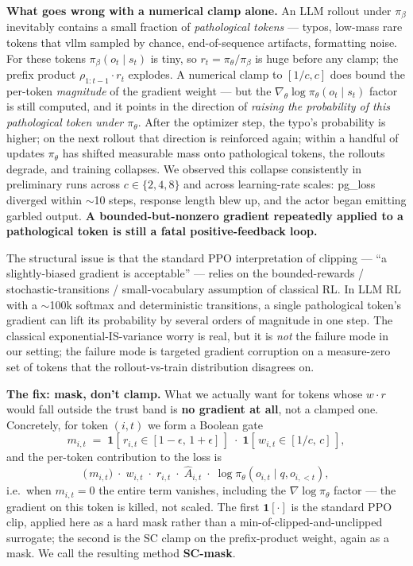 \documentclass[11pt,a4paper]{article}
\theoremstyle{remark}
\begin{document}
\textbf{What goes wrong with a numerical clamp alone.} An LLM rollout under $\pi_\beta$ inevitably contains a small fraction of \emph{pathological tokens} --- typos, low-mass rare tokens that vllm sampled by chance, end-of-sequence artifacts, formatting noise. For these tokens $\pi_\beta(o_t\mid s_t)$ is tiny, so $r_t=\pi_\theta/\pi_\beta$ is huge before any clamp; the prefix product $\rho_{1:t-1}\!\cdot\!r_t$ explodes. A numerical clamp to $[1/c,c]$ does bound the per-token \emph{magnitude} of the gradient weight --- but the $\nabla_\theta\log\pi_\theta(o_t\mid s_t)$ factor is still computed, and it points in the direction of \emph{raising the probability of this pathological token under $\pi_\theta$}. After the optimizer step, the typo's probability is higher; on the next rollout that direction is reinforced again; within a handful of updates $\pi_\theta$ has shifted measurable mass onto pathological tokens, the rollouts degrade, and training collapses. We observed this collapse consistently in preliminary runs across $c\in\{2,4,8\}$ and across learning-rate scales: pg\_loss diverged within $\sim$10 steps, response length blew up, and the actor began emitting garbled output. \textbf{A bounded-but-nonzero gradient repeatedly applied to a pathological token is still a fatal positive-feedback loop.}

The structural issue is that the standard PPO interpretation of clipping --- ``a slightly-biased gradient is acceptable'' --- relies on the bounded-rewards / stochastic-transitions / small-vocabulary assumption of classical RL. In LLM RL with a $\sim$100k softmax and deterministic transitions, a single pathological token's gradient can lift its probability by several orders of magnitude in one step. The classical exponential-IS-variance worry is real, but it is \emph{not} the failure mode in our setting; the failure mode is targeted gradient corruption on a measure-zero set of tokens that the rollout-vs-train distribution disagrees on.

\textbf{The fix: mask, don't clamp.} What we actually want for tokens whose $w\!\cdot\! r$ would fall outside the trust band is \textbf{no gradient at all}, not a clamped one. Concretely, for token $(i,t)$ we form a Boolean gate
\[
m_{i,t} \;=\; \mathbf 1[\,r_{i,t}\in[1-\epsilon,\,1+\epsilon]\,]\;\cdot\;\mathbf 1[\,w_{i,t}\in[1/c,\,c]\,],
\]
and the per-token contribution to the loss is
\[
\big(\,m_{i,t}\big)\;\cdot\;w_{i,t}\;\cdot\;r_{i,t}\;\cdot\;\hat A_{i,t}\;\cdot\;\log\pi_\theta(o_{i,t}\mid q,o_{i,<t}),
\]
i.e.\ when $m_{i,t}=0$ the entire term vanishes, including the $\nabla\log\pi_\theta$ factor --- the gradient on this token is killed, not scaled. The first $\mathbf 1[\cdot]$ is the standard PPO clip, applied here as a hard mask rather than a min-of-clipped-and-unclipped surrogate; the second is the SC clamp on the prefix-product weight, again as a mask. We call the resulting method \textbf{SC-mask}.
\end{document}
